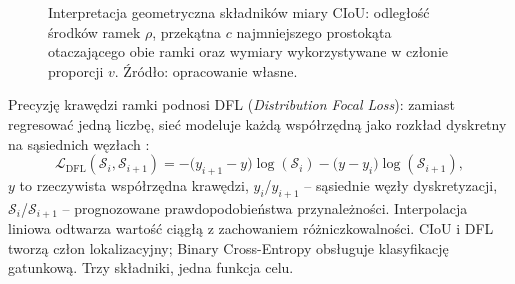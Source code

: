 \begin{figure}[htbp]
 \centering
 \caption{Interpretacja geometryczna składników miary CIoU: odległość środków ramek $\rho$, przekątna $c$ najmniejszego prostokąta otaczającego obie ramki oraz wymiary wykorzystywane w członie proporcji $v$. Źródło: opracowanie własne.}
 \label{fig:ciou_geometria}
\end{figure}

Precyzję krawędzi ramki podnosi DFL (\textit{Distribution Focal Loss}): zamiast regresować jedną liczbę, sieć modeluje każdą współrzędną jako rozkład dyskretny na sąsiednich węzłach \cite{ultralytics2024yolo11}:
\begin{equation}
\mathcal{L}_{\mathrm{DFL}}(\mathcal{S}_i, \mathcal{S}_{i+1}) = -\big(y_{i+1}-y\big)\log(\mathcal{S}_i) - \big(y - y_i\big)\log(\mathcal{S}_{i+1}),
\end{equation}
$y$ to rzeczywista współrzędna krawędzi, $y_i$/$y_{i+1}$ – sąsiednie węzły dyskretyzacji, $\mathcal{S}_i$/$\mathcal{S}_{i+1}$ – prognozowane prawdopodobieństwa przynależności. Interpolacja liniowa odtwarza wartość ciągłą z zachowaniem różniczkowalności. CIoU i DFL tworzą człon lokalizacyjny; Binary Cross-Entropy obsługuje klasyfikację gatunkową. Trzy składniki, jedna funkcja celu.

